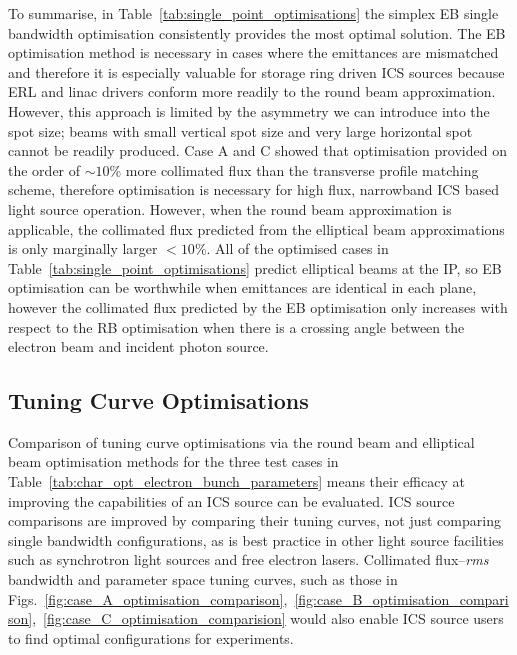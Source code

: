\documentclass[../main.tex]{subfiles}
\begin{document}
To summarise, in Table~\ref{tab:single_point_optimisations} the simplex EB single bandwidth optimisation consistently provides the most optimal solution. The EB optimisation method is necessary in cases where the emittances are mismatched and therefore it is especially valuable for storage ring driven ICS sources because ERL and linac drivers conform more readily to the round beam approximation. However, this approach is limited by the asymmetry we can introduce into the spot size; beams with small vertical spot size and very large horizontal spot cannot be readily produced. Case A and C showed that optimisation provided on the order of $\sim10$\% more collimated flux than the transverse profile matching scheme, therefore optimisation is necessary for high flux, narrowband ICS based light source operation. However, when the round beam approximation is applicable, the collimated flux predicted from the elliptical beam approximations is only marginally larger $< 10\%$. All of the optimised cases in Table~\ref{tab:single_point_optimisations} predict elliptical beams at the IP, so EB optimisation can be worthwhile when emittances are identical in each plane, however the collimated flux predicted by the EB optimisation only increases with respect to the RB optimisation when there is a crossing angle between the electron beam and incident photon source. 

\subsection{Tuning Curve Optimisations}

Comparison of tuning curve optimisations via the round beam and elliptical beam optimisation methods for the three test cases in Table~\ref{tab:char_opt_electron_bunch_parameters} means their efficacy at improving the capabilities of an ICS source can be evaluated. ICS source comparisons are improved by comparing their tuning curves, not just comparing single bandwidth configurations, as is best practice in other light source facilities such as synchrotron light sources and free electron lasers. Collimated flux--\textit{rms} bandwidth and parameter space tuning curves, such as those in Figs.~\ref{fig:case_A_optimisation_comparison},~\ref{fig:case_B_optimisation_comparison},~\ref{fig:case_C_optimisation_comparision} would also enable ICS source users to find optimal configurations for experiments. 
\end{document}

